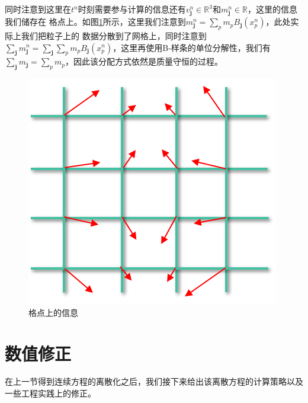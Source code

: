 同时注意到这里在$t^n$时刻需要参与计算的信息还有$v_\mathbf{j}^n \in \mathbb{R}^3$和$m_\mathbf{j}^n \in \mathbb{R}$，这里的信息我们储存在
格点上。如图\ref{fig: grid information}所示，这里我们注意到$m_{\mathbf{j}}^n = \sum_p m_p B_{\mathbf{j}}(x_p^n)$，此处实际上我们把粒子上的
数据分散到了网格上，同时注意到$\sum_{\mathbf{j}} m_\mathbf{j}^n = \sum_{\mathbf{j}}\sum_p m_p B_{\mathbf{j}}(x_p^n)$，这里再使用B-样条的单位分解性，我们有
$\sum_{\mathbf{j}}m_\mathbf{j} = \sum_p m_p$，因此该分配方式依然是质量守恒的过程。
\begin{figure}[htbp]
    \centering
    \includegraphics[scale=0.7]{./images/image14.png}
    \caption{格点上的信息}
    \label{fig: grid information}
\end{figure}

\section{数值修正}
在上一节得到连续方程的离散化之后，我们接下来给出该离散方程的计算策略以及一些工程实践上的修正。
